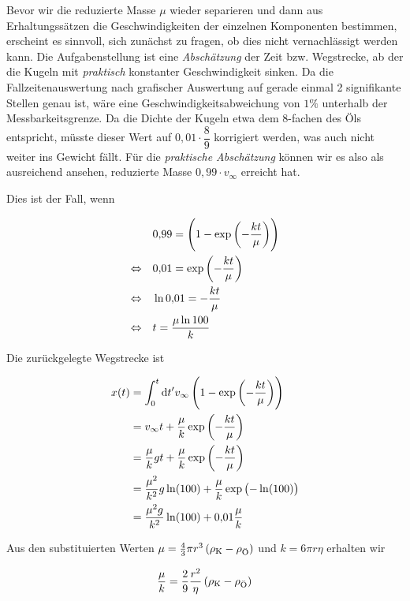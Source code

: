 \documentclass[a4paper,german,12pt,smallheadings]{scrartcl}
\begin{document}
Bevor wir die reduzierte Masse $\mu$ wieder separieren und dann aus
Erhaltungssätzen die Geschwindigkeiten der einzelnen Komponenten bestimmen,
erscheint es sinnvoll, sich zunächst zu fragen, ob dies nicht vernachlässigt
werden kann. Die Aufgabenstellung ist eine \textit{Abschätzung} der Zeit bzw.
Wegstrecke, ab der die Kugeln mit \textit{praktisch} konstanter Geschwindigkeit
sinken. Da die Fallzeitenauswertung nach grafischer Auswertung auf gerade
einmal 2 signifikante Stellen genau ist, wäre eine Geschwindigkeitsabweichung
von $1 \%$ unterhalb der Messbarkeitsgrenze. Da die Dichte der Kugeln etwa dem
8-fachen des Öls entspricht, müsste dieser Wert auf $0{,}01 \cdot \dfrac{8}{9}$
korrigiert werden, was auch nicht weiter ins Gewicht fällt. Für die
\textit{praktische Abschätzung} können wir es also als ausreichend ansehen,
reduzierte Masse $0{,}99 \cdot v_\infty$ erreicht hat.

Dies ist der Fall, wenn

\begin{align*}
  &0{,}99 = \del{1 - \exp\del{-\frac{k t}{\mu}}} \\
  \Leftrightarrow \quad &
  0{,}01 = \exp\del{-\frac{k t}{\mu}} \\
  \Leftrightarrow \quad &
  \ln{0{,}01} = -\frac{k t}{\mu} \\
  \Leftrightarrow \quad &
  t = \frac{\mu \ln{100}}{k}\\
\end{align*}

Die zurückgelegte Wegstrecke ist

\begin{align}
  x(t) &= \int_0^t \dif t' v_{\infty} \del{1 - \exp\del{-\frac{k t}{\mu}}} \\
  &= v_\infty t + \frac{\mu}{k} \exp\del{-\frac{k t}{\mu}} \\
  &= \frac{\mu}{k} g t + \frac{\mu}{k} \exp\del{-\frac{k t}{\mu}} \\
  &= \frac{\mu^2}{k^2} g \ln(100) + \frac{\mu}{k} \exp\del{-\ln(100)} \\
  &= \frac{\mu^2g}{k^2} \ln(100) + 0{,}01 \frac{\mu}{k}
\end{align}

Aus den substituierten Werten $\mu = \frac{4}{3} \pi r^3 \del{\rho_\text{K} -
\rho_\text{Ö}}$ und $k = 6 \pi r \eta$ erhalten wir

\begin{equation}
  \frac{\mu}{k} = \frac{2}{9} \frac{r^2}{\eta} \del{ \rho_\text{K} - \rho_\text{Ö} }
\end{equation}
\end{document}
